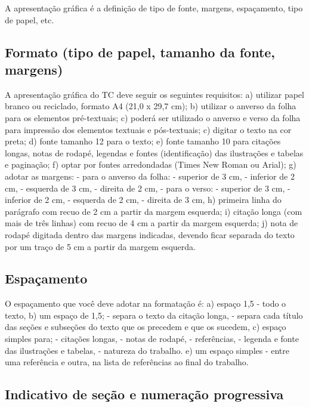 A apresentação gráfica é a definição de tipo de fonte, margens, espaçamento, tipo de papel, etc.

\subsection{Formato (tipo de papel, tamanho da fonte, margens)}

A apresentação gráfica do TC deve seguir os seguintes requisitos:
a) utilizar papel branco ou reciclado, formato A4 (21,0 x 29,7 cm);
b) utilizar o anverso da folha para os elementos pré-textuais;
c) poderá ser utilizado o anverso e verso da folha para impressão dos elementos 
    textuais e pós-textuais;
c) digitar o texto na cor preta;
d) fonte tamanho 12 para o texto;
e) fonte tamanho 10 para citações longas, notas de rodapé, legendas e fontes 
    (identificação) das ilustrações e tabelas e paginação;
f) optar por fontes arredondadas (Times New Roman ou Arial);
g) adotar as margens:
    - para o anverso da folha:
       - superior de 3 cm, 
       - inferior de 2 cm,
       - esquerda de 3 cm,
       - direita de 2 cm,
     - para o verso:
        - superior de 3 cm, 
        - inferior de 2 cm,
        - esquerda de 2 cm,
       - direita de 3 cm,
h) primeira linha do parágrafo com recuo de 2 cm a partir da margem esquerda;
          i) citação longa (com mais de três linhas) com recuo de 4 cm a partir da margem
    esquerda;
j) nota de rodapé digitada dentro das margens indicadas, devendo ficar separada do 
   texto por um traço de 5 cm a partir da margem esquerda.

\subsection{Espaçamento}

O espaçamento que você deve adotar na formatação é:
a) espaço 1,5  - todo o texto,
          b) um espaço de 1,5;
     - separa o texto da citação longa,
     - separa cada título das seções e subseções do texto que os precedem e que os 
       sucedem,
c) espaço simples para;
    - citações longas,
    - notas de rodapé,
    - referências,
    - legenda e fonte das ilustrações e tabelas,
    - natureza do trabalho.
e) um espaço simples -  entre uma referência e outra, na lista de referências ao final do trabalho.

\subsection{Indicativo de seção e numeração progressiva}

